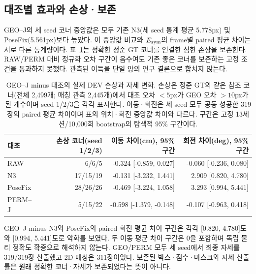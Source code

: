 \subsection{대조별 효과와 손상·보존}

GEO--J의 세 seed 코너 중앙값은 모두 기존 N3(세 seed 통계 평균 5.778px) 및 PoseFix(5.561px)보다 높았다. 이 중앙값 비교와 $E_{\rm sym}$의 frame별 paired 평균 차이는 서로 다른 통계량이다. 표~\ref{sup:joint_action_damage}는 정확한 정준 GT 코너를 연결한 심한 손상을 보존한다. RAW/PERM 대비 정규화 오차 구간이 음수여도 기존 좋은 코너를 보존하는 고정 조건을 통과하지 못했다. 관측된 이득을 단일 양의 연구 결론으로 합치지 않는다.

\begin{table}[t]\centering\small\caption{GEO--J minus 대조의 실제 DEV 손상과 자세 변화. 손상은 정준 GT의 같은 참조 코너(전체 2,499개; 매칭 관측 2,445개)에서 대조 오차 $<5$px가 GEO 오차 $>10$px가 된 개수이며 seed 1/2/3을 각각 표시한다. 이동·회전은 세 seed 모두 공동 성공한 319장의 paired 평균 차이이며 표의 위치·회전 중앙값 차이와 다르다. 구간은 고정 13세션/10,000회 bootstrap의 탐색적 95\% 구간이다.}\label{sup:joint_action_damage}\begin{tabular}{lrrr}\toprule 대조 & 손상 코너(seed 1/2/3) & 이동 차이(cm), 95\% 구간 & 회전 차이(deg), 95\% 구간 \\\midrule

RAW & 6/6/5 & -0.324 [-0.859, 0.027] & -0.060 [-0.236, 0.080]\\

N3 & 17/15/19 & -0.131 [-3.232, 1.441] & 2.909 [0.820, 4.780]\\

PoseFix & 28/26/26 & -0.469 [-3.224, 1.058] & 3.293 [0.994, 5.441]\\

PERM--J & 5/15/22 & -0.598 [-1.379, -0.148] & -0.107 [-0.963, 0.418]\\

\bottomrule\end{tabular}\end{table}

GEO--J minus N3와 PoseFix의 paired 회전 평균 차이 구간은 각각 [0.820, 4.780]도와 [0.994, 5.441]도로 악화를 보였다. 두 이동 평균 차이 구간은 0을 포함하며 독립 물리 정확도 확증으로 해석하지 않는다. GEO/PERM 모두 세 seed에서 최종 자세를 319/319장 산출했고 2D 매칭은 311장이었다. 보존된 박스·점수·마스크와 자세 산출률은 원래 정확한 코너·자세가 보존되었다는 뜻이 아니다.

